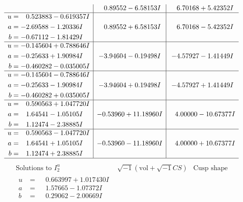 \documentclass[1p]{elsarticle_modified}
\theoremstyle{definition}
\newcommand{\I}{\sqrt{-1}}
\begin{document}
$$\begin{array}{c|c|c}
 & \phantom{-}0.89552 - 6.58153 I & \phantom{-}6.70168 + 5.42352 I \\ \hline\begin{aligned}
u &= \phantom{-}0.523883 - 0.619357 I \\
a &= -2.69588 - 1.20336 I \\
b &= -0.67112 - 1.81429 I\end{aligned}
 & \phantom{-}0.89552 + 6.58153 I & \phantom{-}6.70168 - 5.42352 I \\ \hline\begin{aligned}
u &= -0.145604 + 0.788646 I \\
a &= -0.25633 + 1.90984 I \\
b &= -0.460282 - 0.035005 I\end{aligned}
 & -3.94604 - 0.19498 I & -4.57927 - 1.41449 I \\ \hline\begin{aligned}
u &= -0.145604 - 0.788646 I \\
a &= -0.25633 - 1.90984 I \\
b &= -0.460282 + 0.035005 I\end{aligned}
 & -3.94604 + 0.19498 I & -4.57927 + 1.41449 I \\ \hline\begin{aligned}
u &= \phantom{-}0.590563 + 1.047720 I \\
a &= \phantom{-}1.64541 - 1.05105 I \\
b &= \phantom{-}1.12474 - 2.38885 I\end{aligned}
 & -0.53960 + 11.18960 I & \phantom{-}4.00000 - 10.67377 I \\ \hline\begin{aligned}
u &= \phantom{-}0.590563 - 1.047720 I \\
a &= \phantom{-}1.64541 + 1.05105 I \\
b &= \phantom{-}1.12474 + 2.38885 I\end{aligned}
 & -0.53960 - 11.18960 I & \phantom{-}4.00000 + 10.67377 I\\
 \hline 
 \end{array}$$\newpage$$\begin{array}{c|c|c}  
\text{Solutions to }I^u_{2}& \I (\text{vol} + \sqrt{-1}CS) & \text{Cusp shape}\\
 \hline 
\begin{aligned}
u &= \phantom{-}0.663997 + 1.017430 I \\
a &= \phantom{-}1.57665 - 1.07372 I \\
b &= \phantom{-}0.29062 - 2.00669 I\end{aligned}

\end{array}$$
\end{document}
